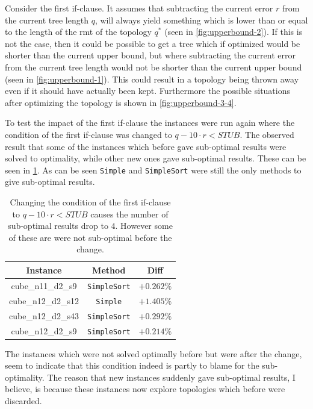 Consider the first if-clause. It assumes that subtracting the current error $r$
from the current tree length $q$, will always yield something which is lower
than or equal to the length of the \ac{rmt} of the topology $q^\ast$ (seen in
\cref{fig:upperbound-2}). If this is not the case, then it could be possible to
get a tree which if optimized would be shorter than the current upper bound, but
where subtracting the current error from the current tree length would not be
shorter than the current upper bound (seen in \cref{fig:upperbound-1}). This
could result in a topology being thrown away even if it should have actually
been kept. Furthermore the possible situations after optimizing the topology is
shown in \cref{fig:upperbound-3-4}.

To test the impact of the first if-clause the instances were run again where the
condition of the first if-clause was changed to $q - 10 \cdot r <
\textit{STUB}$. The observed result that some of the instances which before gave
sub-optimal results were solved to optimality, while other new ones gave
sub-optimal results. These can be seen in \cref{tab:correctness-errors-4}. As
can be seen \texttt{Simple} and \texttt{SimpleSort} were still the only methods
to give sub-optimal results.

\begin{table}[htbp]
  \centering
  \begin{tabular}{ccc}
    \toprule
    Instance           & Method              & Diff       \\
    \midrule
    cube\_n11\_d2\_s9  & \texttt{SimpleSort} & $+0.262\%$ \\
    cube\_n12\_d2\_s12 & \texttt{Simple}     & $+1.405\%$ \\
    cube\_n12\_d2\_s43 & \texttt{SimpleSort} & $+0.292\%$ \\
    cube\_n12\_d2\_s9  & \texttt{SimpleSort} & $+0.214\%$ \\
    \bottomrule
  \end{tabular}
  \caption[Sub-optimal results with condition $q - 10 \cdot r < \textit{STUB}$]{
    Changing the condition of the first if-clause to $q - 10 \cdot r <
    \textit{STUB}$ causes the number of sub-optimal results drop to $4$.
    However some of these are were not sub-optimal before the
    change.\label{tab:correctness-errors-4}}
\end{table}

The instances which were not solved optimally before but were after the change,
seem to indicate that this condition indeed is partly to blame for the
sub-optimality. The reason that new instances suddenly gave sub-optimal results,
I believe, is because these instances now explore topologies which before were
discarded.

